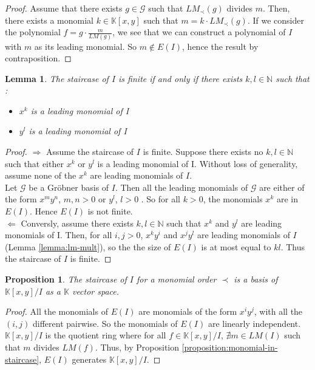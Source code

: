 \documentclass{article}
\newtheorem{lemma}{Lemma}[section]
\newtheorem{proposition}{Proposition}[section]
\begin{document}
\begin{proof}
    Assume that there exists $g \in \mathscr{G}$ such that $LM_{\prec}(g)$ divides $m$. Then, there exists a monomial $k \in \mathbb{K}[x, y]$ such that $m = k \cdot LM_{\prec}(g)$. If we consider the polynomial $f = g \cdot \displaystyle \frac{m}{LM(g)}$, we see that we can construct a polynomial of $I$ with $m$ as its leading monomial. So $m \notin E(I)$, hence the result by contraposition.
\end{proof}

\begin{lemma} \label{lemma:finite-staircase-lm}
    The staircase of $I$ is finite if and only if there exists $k, l \in \mathbb{N}$ such that :
    \begin{itemize}
        \item $x^{k}$ is a leading monomial of I
        \item $y^{l}$ is a leading monomial of I
    \end{itemize}
\end{lemma}

\begin{proof}
    $\Rightarrow$ Assume the staircase of $I$ is finite. Suppose there exists no $k, l \in \mathbb{N}$ such that either $x^{k}$ or $y^{l}$ is a leading monomial of I. Without loss of generality, assume none of the $x^{k}$ are leading monomials of $I$. \\
    Let $\mathscr{G}$ be a Gröbner basis of $I$. Then all the leading monomials of $\mathscr{G}$ are either of the form $x^{m}y^{n}$, $m,n > 0$ or $y^{l}$, $l > 0$ . So for all $k > 0$, the monomials $x^{k}$ are in $E(I)$. Hence $E(I)$ is not finite. \\
    $\Leftarrow$ Conversly, assume there exists $k, l \in \mathbb{N}$ such that $x^{k}$ and $y^{l}$ are leading monomials of I. Then, for all $i, j > 0$, $x^{k}y^{i}$ and $x^{j}y^{l}$ are leading monomials of $I$ (Lemma \ref{lemma:lm-mult}), so the the size of $E(I)$ is at most equal to $kl$. Thus the staircase of $I$ is finite.
\end{proof}

\begin{proposition}
    The staircase of $I$ for a monomial order $\prec$ is a basis of $\mathbb{K}[x, y] / I$ as a $\mathbb{K}$ vector space.
\end{proposition}

\begin{proof}
    All the monomials of $E(I)$ are monomials of the form $x^{i}y^{j}$, with all the $(i, j)$ different pairwise. So the monomials of $E(I)$ are linearly independent. $\mathbb{K}[x,y] / I$ is the quotient ring where for all $f \in \mathbb{K}[x,y] / I$, $\nexists m \in LM(I)$ such that $m$ divides $LM(f)$. Thus, by Proposition \ref{proposition:monomial-in-staircase}, $E(I)$ generates $\mathbb{K}[x,y] / I$.
\end{proof}
\end{document}
